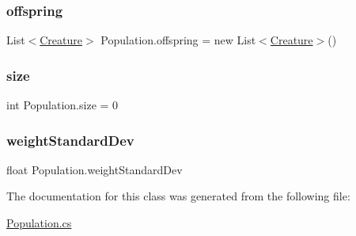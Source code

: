 \mbox{\label{class_population_a69c9eb7cfdb0e5d269ae9ac24290762d}} 
\subsubsection{\texorpdfstring{offspring}{offspring}}
{\footnotesize\ttfamily List$<$\mbox{\hyperlink{class_creature}{Creature}}$>$ Population.\+offspring = new List$<$\mbox{\hyperlink{class_creature}{Creature}}$>$()}

\mbox{\label{class_population_a1df2f4121cc9396d17e0bbc6b8a14b81}} 
\subsubsection{\texorpdfstring{size}{size}}
{\footnotesize\ttfamily int Population.\+size = 0}

\mbox{\label{class_population_a6b94d7c76b73372f59e95368b301c8f0}} 
\subsubsection{\texorpdfstring{weight\+Standard\+Dev}{weightStandardDev}}
{\footnotesize\ttfamily float Population.\+weight\+Standard\+Dev}



The documentation for this class was generated from the following file\+:\begin{DoxyCompactItemize}
\item 
\mbox{\hyperlink{_population_8cs}{Population.\+cs}}\end{DoxyCompactItemize}
